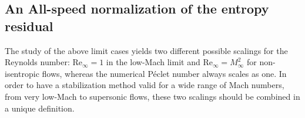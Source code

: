 \documentclass[preprint,10pt]{elsarticle}
\renewcommand{\Re}{\textrm{Re}}
\newcommand{\Pe}{\textrm{P\'e}}
\newcommand{\eqt}[1]{Eq.~(\ref{#1})}                     %
\begin{document}
%
%

\subsection{An All-speed normalization of the entropy residual} \label{sec:new_normaliz}

The study of the above limit cases yields two different possible scalings for the Reynolds number: 
$\Re_\infty = 1$ in the low-Mach limit and $\Re_\infty  = M_\infty^2$ for non-isentropic flows, 
whereas the numerical P\'eclet number always scales as one. In order to have a stabilization method 
valid for a wide range of Mach numbers, from very low-Mach to supersonic flows, these two scalings should 
be combined in a unique definition. 
\end{document}
